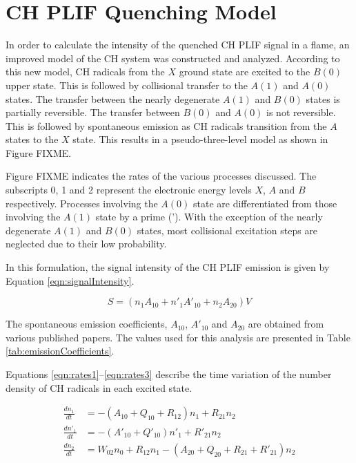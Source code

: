 \chapter{CH PLIF Quenching Model}
\label{app:quenchingmodel}

In order to calculate the intensity of the quenched CH PLIF signal in a flame, an improved model of the CH system was constructed and analyzed.
According to this new model, CH radicals from the \(X\) ground state are excited to the \(B(0)\) upper state.
This is followed by collisional transfer to the \(A(1)\) and \(A(0)\) states.
The transfer between the nearly degenerate \(A(1)\) and \(B(0)\) states is partially reversible.
The transfer between \(B(0)\) and \(A(0)\) is not reversible.
This is followed by spontaneous emission as CH radicals transition from the \(A\) states to the \(X\) state.
This results in a pseudo-three-level model as shown in Figure FIXME.

Figure FIXME indicates the rates of the various processes discussed.
The subscripts 0, 1 and 2 represent the electronic energy levels \(X\), \(A\) and \(B\) respectively.
Processes involving the \(A(0)\) state are differentiated from those involving the \(A(1)\) state by a prime (').
With the exception of the nearly degenerate \(A(1)\) and \(B(0)\) states, most collisional excitation steps are neglected due to their low probability.

In this formulation, the signal intensity of the CH PLIF emission is given by Equation \ref{eqn:signalIntensity}.

\begin{equation}
S = ( n_1A_{10} + n'_1A'_{10} + n_2A_{20} )V
\label{eqn:signalIntensity}
\end{equation}

The spontaneous emission coefficients, \(A_{10}\), \(A'_{10}\) and \(A_{20}\) are obtained from various published papers\cite{1985-garland-a,1996-luque-b,2005-richmond}.
The values used for this analysis are presented in Table \ref{tab:emissionCoefficients}.



Equations \ref{eqn:rates1}--\ref{eqn:rates3} describe the time variation of the number density of CH radicals in each excited state.

\begin{align}
\frac{dn_1}{dt} &= -( A_{10} + Q_{10} + R_{12} )n_1 + R_{21}n_2
\label{eqn:rates1}\\
\frac{dn'_1}{dt} &= -( A'_{10} + Q'_{10} )n'_1 + R'_{21}n_2
\label{eqn:rates2}\\
\frac{dn_2}{dt} &= W_{02}n_0 + R_{12}n_1 - ( A_{20} + Q_{20} + R_{21} + R'_{21} )n_2
\label{eqn:rates3}
\end{align}

